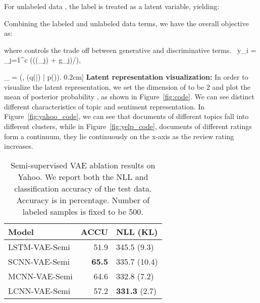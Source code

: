 \documentclass{article}
\begin{document}
For unlabeled data , the label is treated as a latent
variable, yielding:
{\small

}
Combining the labeled and unlabeled data terms, we have the overall objective
as:

where  controls the trade off between generative and
discriminative terms.
\
  y_{i} =  {\sum_{j=1}^{c}
  \exp((\log(\pi_{j}) + g_{j})/\tau)},

  _{} = \max(\gamma, (q(|) | p()).
  \label{eq:gamma}
0.2cm]
{\bf Latent representation visualization:} In order to visualize the latent representation,
we set the dimension of  to be 2
and plot the mean of posterior probability , as shown in
Figure~\ref{fig:code}. We can see distinct different characteristics of topic
and sentiment representation. In Figure~\ref{fig:yahoo_code}, we can see that documents
of different topics fall into different clusters, while in
Figure~\ref{fig:yelp_code}, documents of different ratings
form a continuum, they lie continuously on the x-axis as the review rating increases.


\begin{table}[!thp]
\small
  \centering
  \begin{tabular}{l r l}
    Model & ACCU & NLL (KL) \\
    \toprule
    LSTM-VAE-Semi & 51.9 & 345.5 (9.3) \\
    SCNN-VAE-Semi & {\bf 65.5} & 335.7 (10.4) \\
    MCNN-VAE-Semi & 64.6 & 332.8 (7.2) \\
    LCNN-VAE-Semi & 57.2 & {\bf 331.3} (2.7) \\
    \bottomrule
  \end{tabular}
  \caption{Semi-supervised VAE ablation results on Yahoo.
  We report both the NLL and classification
  accuracy of the test data. Accuracy is in percentage.
  Number of labeled samples is fixed to be 500.}
  \label{tab:yahoosemi_compare}
\end{table}
\end{document}
